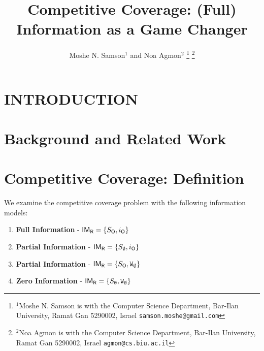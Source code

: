 \documentclass[letterpaper, 10 pt, conference]{ieeeconf}  %
\title{\LARGE \bf
Competitive  Coverage:  (Full)  Information  as  a  Game  Changer}
\author{Moshe N. Samson$^{1}$ and Noa Agmon$^{2}$%
\thanks{$^{1}$Moshe N. Samson is with the Computer Science Department,
        Bar-Ilan University, Ramat Gan 5290002, Israel
        {\tt\small samson.moshe@gmail.com}}%
\thanks{$^{2}$Noa Agmon is with the Computer Science Department, Bar-Ilan University, Ramat Gan 5290002, Israel
        {\tt\small agmon@cs.biu.ac.il}}%
}
\theoremstyle{definition}
\newcommand{\rob}{{{\sf R}}\xspace}
\newcommand{\opp}{{{\sf O}}\xspace}
\newcommand{\w}{{{\texttt W}}\xspace}
\newcommand{\fcc}{{{\sf{FCC}}}\xspace}
\newcommand{\IM}{{{\sf{IM}}}\xspace}
\begin{document}
\maketitle
\thispagestyle{empty}
\pagestyle{empty}

\begin{abstract}

\end{abstract}

\section{INTRODUCTION}


\section{Background and Related Work}


\section{Competitive Coverage: Definition}


We examine the competitive coverage problem with %
the following information models:%
\begin{enumerate}
\item \textbf{Full Information} - $\IM_{\rob}=\lbrace S_{\opp},i_{\opp}\rbrace$
\item \textbf{Partial Information} - $\IM_{\rob}=\lbrace S_{\emptyset},i_{\opp}\rbrace$
\item \textbf{Partial Information} - $\IM_{\rob}=\lbrace S_{\opp},\w_{\emptyset}\rbrace$
\item \textbf{Zero Information} - $\IM_{\rob}=\lbrace S_{\emptyset},\w_{\emptyset}\rbrace$
\end{enumerate}
\end{document}
